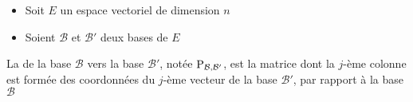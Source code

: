 \begin{frame}

\begin{itemize}
  \item Soit $E$ un espace vectoriel de dimension $n$
  
\pause

  \item Soient $\mathcal{B}$ et $\mathcal{B}'$ deux bases de $E$
\end{itemize}

\pause

\begin{mydefinition}
La   de la base $\mathcal{B}$ vers la base 
$\mathcal{B}'$, notée $\mathop{\text{P}}\nolimits_{\mathcal{B},\mathcal{B'}}$,
est la matrice dont la $j$-ème colonne est formée des coordonnées du $j$-ème 
vecteur de la base $\mathcal{B}'$, 
par rapport à la base $\mathcal{B}$
\end{mydefinition}

\pause


\end{frame}


